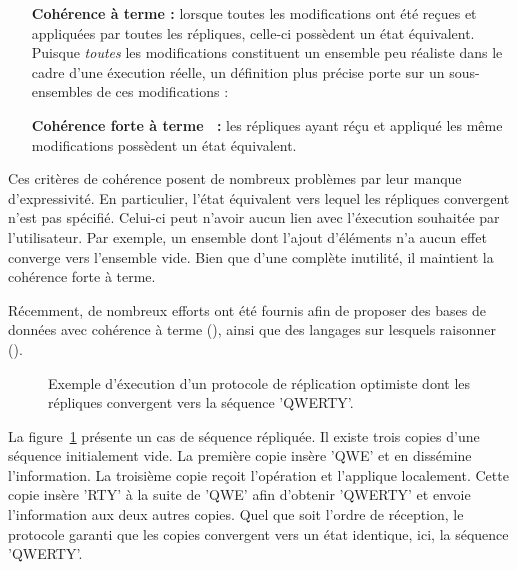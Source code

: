 \begin{itemize}
\item [\textbf{Cohérence à terme :}] lorsque toutes les modifications ont été
  reçues et appliquées par toutes les répliques, celle-ci possèdent un état
  équivalent. Puisque \emph{toutes} les modifications constituent un ensemble
  peu réaliste dans le cadre d'une éxecution réelle, un définition plus précise
  porte sur un sous-ensembles de ces modifications :
\item [\textbf{Cohérence forte à terme~\cite{shapiro2011conflict} :}] les
  répliques ayant réçu et appliqué les même modifications possèdent un état
  équivalent.
\end{itemize}

Ces critères de cohérence posent de nombreux problèmes par leur manque
d'expressivité. En particulier, l'état équivalent vers lequel les répliques
convergent n'est pas spécifié. Celui-ci peut n'avoir aucun lien avec l'éxecution
souhaitée par l'utilisateur. Par exemple, un ensemble dont l'ajout d'éléments
n'a aucun effet converge vers l'ensemble vide. Bien que d'une complète
inutilité, il maintient la cohérence forte à terme.

Récemment, de nombreux efforts ont été fournis afin de proposer des bases de
données avec cohérence à terme (\REF), ainsi que des langages sur lesquels
raisonner (\REF).

\begin{figure}
  \centering
  
  \caption{\label{repl:fig:optimisticexample} Exemple d'éxecution d'un protocole
    de réplication optimiste dont les répliques convergent vers la séquence
    'QWERTY'.}
\end{figure}

La figure~\ref{repl:fig:optimisticexample} présente un cas de séquence
répliquée.  Il existe trois copies d'une séquence initialement vide. La première
copie insère 'QWE' et en dissémine l'information. La troisième copie reçoit
l'opération et l'applique localement. Cette copie insère 'RTY' à la suite de
'QWE' afin d'obtenir 'QWERTY' et envoie l'information aux deux autres
copies. Quel que soit l'ordre de réception, le protocole garanti que les copies
convergent vers un état identique, ici, la séquence 'QWERTY'.


